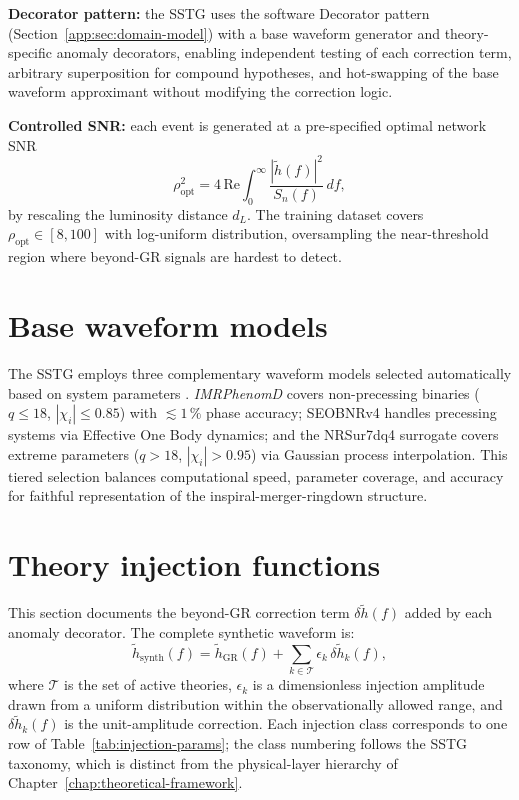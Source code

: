 \documentclass[11pt,a4paper, english]{book}
\theoremstyle{plain}
\theoremstyle{definition}
\numberwithin{equation}{chapter}
\numberwithin{figure}{chapter}
\numberwithin{table}{chapter}
\begin{document}
\textbf{Decorator pattern:} the SSTG uses the software Decorator pattern (Section~\ref{app:sec:domain-model}) with a base waveform generator and theory-specific anomaly decorators, enabling independent testing of each correction term, arbitrary superposition for compound hypotheses, and hot-swapping of the base waveform approximant without modifying the correction logic.

\textbf{Controlled SNR:} each event is generated at a pre-specified optimal network SNR
\begin{equation}
  \label{eq:optimal_snr}
  \rho_\mathrm{opt}^2 = 4\,\mathrm{Re}
    \int_0^\infty \frac{|\tilde{h}(f)|^2}{S_n(f)}\,df,
\end{equation}
by rescaling the luminosity distance $d_L$. The training dataset covers $\rho_\mathrm{opt} \in [8, 100]$ with log-uniform distribution, oversampling the near-threshold region where beyond-GR signals are hardest to detect.

\section{Base waveform models}
\label{sec:waveform_base}

The SSTG employs three complementary waveform models selected automatically based on system parameters \cite{Khan_2016}. \textit{IMRPhenomD} covers non-precessing binaries ($q \leq 18$, $|\chi_i| \leq 0.85$) with $\lesssim 1\,\%$ phase accuracy; SEOBNRv4 \cite{Bohe_2017} handles precessing systems via Effective One Body dynamics; and the NRSur7dq4 surrogate \cite{Varma_2019} covers extreme parameters ($q > 18$, $|\chi_i| > 0.95$) via Gaussian process interpolation. This tiered selection balances computational speed, parameter coverage, and accuracy for faithful representation of the inspiral-merger-ringdown structure.

\section{Theory injection functions}
\label{sec:theory_injections}

This section documents the beyond-GR correction term $\delta\tilde{h}(f)$
added by each anomaly decorator.  The complete synthetic waveform is:
\begin{equation}
  \label{eq:synthetic_total}
  \tilde{h}_\mathrm{synth}(f) = \tilde{h}_\mathrm{GR}(f)
    + \sum_{k \in \mathcal{T}} \epsilon_k\,\delta\tilde{h}_k(f),
\end{equation}
where $\mathcal{T}$ is the set of active theories, $\epsilon_k$ is a
dimensionless injection amplitude drawn from a uniform distribution within
the observationally allowed range, and $\delta\tilde{h}_k(f)$ is the
unit-amplitude correction.
Each injection class corresponds to one row of 
Table~\ref{tab:injection-params}; the class numbering 
follows the SSTG taxonomy, which is distinct from the 
physical-layer hierarchy of 
Chapter~\ref{chap:theoretical-framework}.
\end{document}
